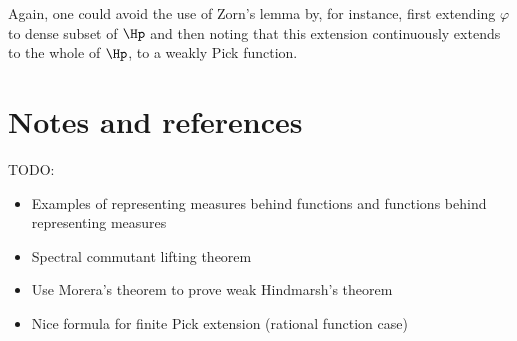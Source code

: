 Again, one could avoid the use of Zorn's lemma by, for instance, first extending $\varphi$ to dense subset of $\Hp$ and then noting that this extension continuously extends to the whole of $\Hp$, to a weakly Pick function.


\section{Notes and references}

TODO:
\begin{itemize}
	\item Examples of representing measures behind functions and functions behind representing measures
	\item Spectral commutant lifting theorem
	\item Use Morera's theorem to prove weak Hindmarsh's theorem
	\item Nice formula for finite Pick extension (rational function case)
\end{itemize}






